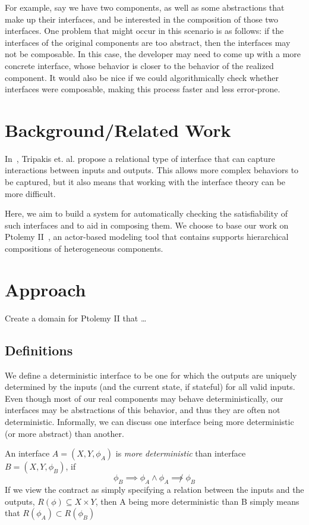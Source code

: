 \documentclass[preprint,11pt,authoryear]{sigplanconf}
\begin{document}
For example, say we have two components, as well as some abstractions that make up their interfaces, and be interested in the composition of those two interfaces.  One problem that might occur in this scenario is as follows: if the interfaces of the original components are too abstract, then the interfaces may not be composable.  In this case, the developer may need to come up with a more concrete interface, whose behavior is closer to the behavior of the realized component.  It would also be nice if we could algorithmically check whether interfaces were composable, making this process faster and less error-prone.

\section{Background/Related Work}
In~\cite{realationalInterfaces}, Tripakis et. al. propose a relational type of interface that can capture interactions between inputs and outputs.  This allows more complex behaviors to be captured, but it also means that working with the interface theory can be more difficult.

Here, we aim to build a system for automatically checking the satisfiability of such interfaces and to aid in composing them.  We choose to base our work on Ptolemy II~\cite{ptII}, an actor-based modeling tool that contains supports hierarchical compositions of heterogeneous components.

\section{Approach}
Create a domain for Ptolemy II that \dots

\subsection{Definitions}
We define a deterministic interface to be one for which the outputs are uniquely determined by the inputs (and the current state, if stateful) for all valid inputs.  Even though most of our real components may behave deterministically, our interfaces may be abstractions of this behavior, and thus they are often not deterministic.  Informally, we can discuss one interface being more deterministic (or more abstract) than another.

An interface $A=(X,Y,\phi_A)$ is \emph{more deterministic} than interface $B=(X,Y,\phi_B)$, if
\[
\phi_B \implies \phi_A \wedge \phi_A \not\implies \phi_B
\]
If we view the contract as simply specifying a relation between the inputs and the outputs, $R(\phi) \subseteq X \times Y$, then A being more deterministic than B simply means that
$R(\phi_A) \subset R(\phi_B)$
\end{document}
